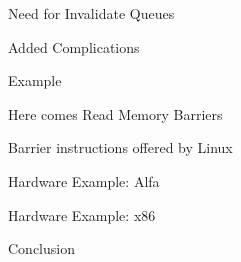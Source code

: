 \documentclass[notes, xcolor = dvipsnames]{beamer}
\begin{document}

    \begin{frame}{Need for Invalidate Queues}
        
    \end{frame}

    \begin{frame}{Added Complications}
        
    \end{frame}

    \begin{frame}{Example}
        
    \end{frame}

    \begin{frame}{Here comes Read Memory Barriers}
        
    \end{frame}

    \begin{frame}{Barrier instructions offered by Linux}
        
    \end{frame}

    \begin{frame}{Hardware Example: Alfa}
        
    \end{frame}

    \begin{frame}{Hardware Example: x86}
    
    \end{frame}

    \begin{frame}{Conclusion}
        
    \end{frame}
\end{document}
